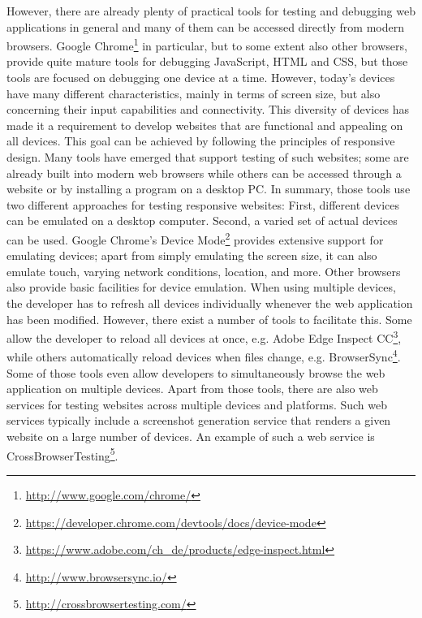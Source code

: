 However, there are already plenty of practical tools for testing and debugging web applications in general and many of them can be accessed directly from modern browsers. Google Chrome\footnote{\url{http://www.google.com/chrome/}} in particular, but to some extent also other browsers, provide quite mature tools for debugging JavaScript, HTML and CSS, but those tools are focused on debugging one device at a time.  However, today's devices have many different characteristics, mainly in terms of screen size, but also concerning their input capabilities and connectivity. This diversity of devices has made it a requirement to develop websites that are functional and appealing on all devices. This goal can be achieved by following the principles of responsive design. Many tools have emerged that support testing of such websites; some are already built into modern web browsers while others can be accessed through a website or by installing a program on a desktop PC. In summary, those tools use two different approaches for testing responsive websites: First, different devices can be emulated on a desktop computer. Second, a varied set of actual devices can be used. Google Chrome's Device Mode\footnote{\url{https://developer.chrome.com/devtools/docs/device-mode}} provides extensive support for emulating devices; apart from simply emulating the screen size, it can also emulate touch, varying network conditions, location, and more. Other browsers also provide basic facilities for device emulation. When using multiple devices, the developer has to refresh all devices individually whenever the web application has been modified. However, there exist a number of tools to facilitate this. Some allow the developer to reload all devices at once, e.g. Adobe Edge Inspect CC\footnote{\url{https://www.adobe.com/ch_de/products/edge-inspect.html}}, while others automatically reload devices when files change, e.g. BrowserSync\footnote{\url{http://www.browsersync.io/}}. Some of those tools even allow developers to simultaneously browse the web application on multiple devices. Apart from those tools, there are also web services for testing websites across multiple devices and platforms. Such web services typically include a screenshot generation service that renders a given website on a large number of devices. An example of such a web service is CrossBrowserTesting\footnote{\url{http://crossbrowsertesting.com/}}.

